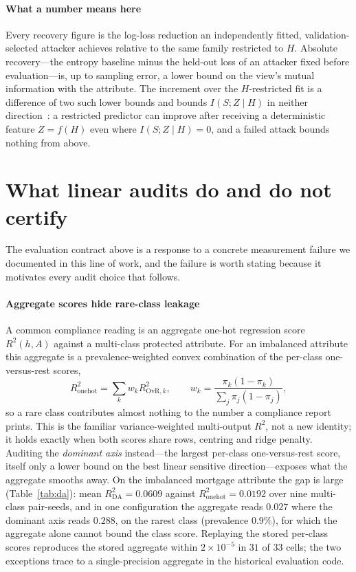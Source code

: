 \documentclass[conference]{IEEEtran}
\begin{document}
\paragraph{What a number means here} Every recovery figure is the log-loss reduction an independently
fitted, validation-selected attacker achieves relative to the same family restricted to $H$. Absolute
recovery---the entropy baseline minus the held-out loss of an attacker fixed before evaluation---is, up
to sampling error, a lower bound on the view's mutual information with the attribute. The increment over
the $H$-restricted fit is a difference of two such lower bounds and bounds $I(S;Z\mid H)$ in neither
direction~\cite{mcallester2020formal}: a restricted predictor can improve after receiving a deterministic
feature $Z=f(H)$ even where $I(S;Z\mid H)=0$, and a failed attack bounds nothing from above.

\section{What linear audits do and do not certify}
\label{sec:audit}

The evaluation contract above is a response to a concrete measurement failure we documented in this line
of work, and the failure is worth stating because it motivates every audit choice that follows.

\paragraph{Aggregate scores hide rare-class leakage} A common compliance reading is an aggregate one-hot
regression score $R^2(h,A)$ against a multi-class protected attribute. For an imbalanced attribute this
aggregate is a prevalence-weighted convex combination of the per-class one-versus-rest scores,
\[
R^2_{\mathrm{onehot}}=\textstyle\sum_k w_k R^2_{\mathrm{OvR},k},\qquad
w_k=\frac{\pi_k(1-\pi_k)}{\sum_j \pi_j(1-\pi_j)},
\]
so a rare class contributes almost nothing to the number a compliance report prints. This is the
familiar variance-weighted multi-output $R^2$, not a new identity; it holds exactly when both scores share
rows, centring and ridge penalty. Auditing the \emph{dominant axis} instead---the largest per-class
one-versus-rest score, itself only a lower bound on the best linear sensitive direction---exposes what the
aggregate smooths away. On the imbalanced mortgage attribute the gap is large (Table~\ref{tab:da}): mean
$R^2_{\mathrm{DA}}=0.0609$ against $R^2_{\mathrm{onehot}}=0.0192$ over nine multi-class pair-seeds, and in
one configuration the aggregate reads $0.027$ where the dominant axis reads $0.288$, on the rarest
class (prevalence $0.9\%$), for which the aggregate alone cannot bound the class score. Replaying the
stored per-class scores reproduces the stored aggregate within $2\times10^{-5}$ in $31$ of $33$ cells; the
two exceptions trace to a single-precision aggregate in the historical evaluation code.
\end{document}
